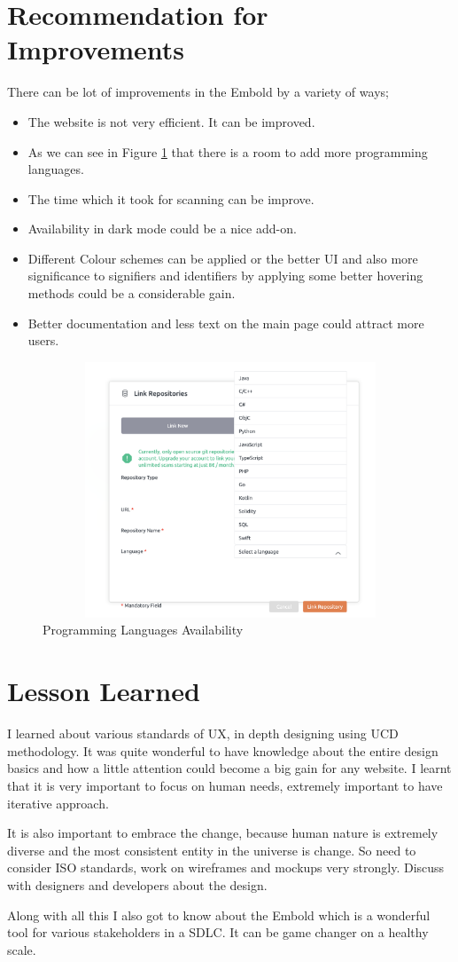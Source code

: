 \section{Recommendation for Improvements}
There can be lot of improvements in the Embold by a variety of ways; 
\begin{itemize} 
\item The website is not very efficient. It can be improved.
\item  As we can see in Figure \ref{fig:improve} that there is a room to add more programming languages.
\item The time which it took for scanning can be improve. 
\item Availability in dark mode could be a nice add-on.
\item Different Colour schemes can be applied or the better UI and also more significance to signifiers and identifiers by applying some better hovering methods could be a considerable gain.
\item Better documentation and less text on the main page could attract more users.   
\end{itemize}
\begin{figure}[htbp]
\begin{center}
\includegraphics[width=4.5in, height=3in]{negatives.png}
\caption{Programming Languages Availability ~\cite{emboldio}}
\label{fig:improve}
\end{center}
\end{figure}
\section{Lesson Learned}
I learned about various standards of UX, in depth designing using UCD methodology. It was quite wonderful to have knowledge about the entire design basics and how a little attention could become a big gain for any website. I learnt that it is very important to focus on human needs, extremely important to have iterative approach.\par
It is also important to embrace the change, because human nature is extremely diverse and the most consistent entity in the universe is change. So need to consider ISO standards, work on wireframes and mockups very strongly. Discuss with designers and developers about the design. \par
Along with all this I also got to know about the Embold which is a wonderful tool for various stakeholders in a SDLC. It can be game changer on a healthy scale.

